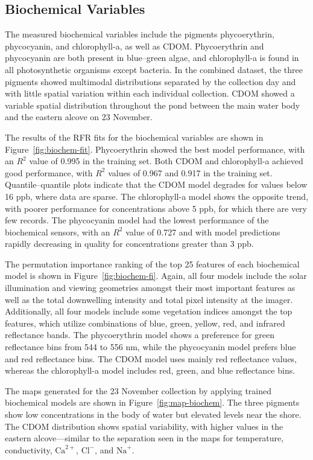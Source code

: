 \newpage

\subsection{Biochemical Variables}

The measured biochemical variables include the pigments phycoerythrin, phycocyanin, and chlorophyll-a, as well as CDOM. Phycoerythrin and phycocyanin are both present in blue--green algae, and chlorophyll-a is found in all photosynthetic organisms except bacteria. In the combined dataset, the three pigments showed multimodal distributions separated by the collection day and with little spatial variation within each individual collection. CDOM showed a variable spatial distribution throughout the pond between the main water body and the eastern alcove on 23 November.

The results of the RFR fits for the biochemical variables are shown in Figure~\ref{fig:biochem-fit}. Phycoerythrin showed the best model performance, with an $R^2$ value of 0.995 in the training set. Both CDOM and chlorophyll-a achieved good performance, with $R^2$ values of 0.967 and 0.917 in the training set. Quantile--quantile plots indicate that the CDOM model degrades for values below 16 ppb, where data are sparse. The chlorophyll-a model shows the opposite trend, with poorer performance for concentrations above 5 ppb, for which there are very few records. The phycocyanin model had the lowest performance of the biochemical sensors, with an $R^2$ value of 0.727 and with model predictions rapidly decreasing in quality for concentrations greater than 3 ppb. 

The permutation importance ranking of the top 25 features of each biochemical model is shown in Figure~\ref{fig:biochem-fi}. Again, all four models include the solar illumination and viewing geometries amongst their most important features as well as the total downwelling intensity and total pixel intensity at the imager. Additionally, all four models include some vegetation indices amongst the top features, which utilize combinations of blue, green, yellow, red, and infrared reflectance bands. The phycoerythrin model shows a preference for green reflectance bins from 544 to 556 nm, while the phycocyanin model prefers blue and red reflectance bins. The CDOM model uses mainly red reflectance values, whereas the chlorophyll-a model includes red, green, and blue reflectance bins.

The maps generated for the 23 November collection by applying trained biochemical models are shown in Figure~\ref{fig:map-biochem}. The three pigments show low concentrations in the body of water but elevated levels near the shore. The CDOM distribution shows spatial variability, with higher values in the eastern alcove---similar to the separation seen in the maps for temperature, conductivity, $\textrm{Ca}^{2+}$, $\textrm{Cl}^{-}$, and $\textrm{Na}^{+}$.



